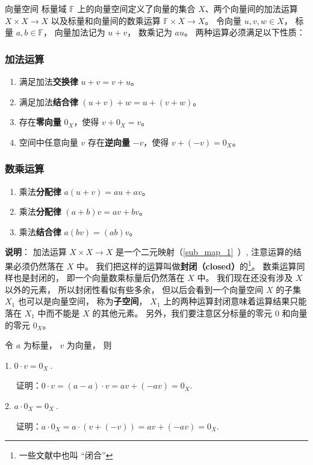 \begin{definition}{向量空间}
标量域 $\mathbb F$ 上的向量空间定义了向量的集合 $X$、两个向量间的加法运算 $X\times X \to X$ 以及标量和向量间的数乘运算 $\mathbb F \times X \to X$。 令向量 $u,v,w \in X$， 标量 $a,b \in \mathbb F$， 向量加法记为 $u + v$， 数乘记为 $a u$。 两种运算必须满足以下性质：

\subsubsection{加法运算}
\begin{enumerate}
\item 满足加法\textbf{交换律} $u + v = v + u$。
\item 满足加法\textbf{结合律} $(u + v) + w = u + (v + w)$。
\item 存在\textbf{零向量} $0_X$，使得 $v + 0_X = v$。
\item 空间中任意向量 $v$ 存在\textbf{逆向量} $-v$，使得 $v + (-v) = 0_X$。
\end{enumerate}

\subsubsection{数乘运算}
\begin{enumerate}
\item 乘法\textbf{分配律} $a(u + v) = au + av$。
\item 乘法\textbf{分配律} $(a + b)v = av + bv$。
\item 乘法\textbf{结合律} $a (b v) = (ab) v$。
\end{enumerate}
\end{definition}

\textbf{说明}： 加法运算 $X \times X \to X$ 是一个二元映射（\autoref{sub_map_1}~）, 注意运算的结果必须仍然落在 $X$ 中。 我们把这样的运算叫做\textbf{封闭（closed）}的\footnote{一些文献中也叫 “闭合”}。 数乘运算同样也是封闭的， 即一个向量数乘标量后仍然落在 $X$ 中。 我们现在还没有涉及 $X$ 以外的元素， 所以封闭性看似有些多余， 但以后会看到一个向量空间 $X$ 的子集 $X_1$ 也可以是向量空间， 称为\textbf{子空间}， $X_1$ 上的两种运算封闭意味着运算结果只能落在 $X_1$ 中而不能是 $X$ 的其他元素。 另外，我们要注意区分标量的零元 $0$ 和向量的零元 $0_X$。

\begin{corollary}{}
令 $a$ 为标量， $v$ 为向量， 则

1. $0\cdot v=0_X~.$

$\quad$ 证明：$0\cdot v=(a-a)\cdot v=av+(-av)=0_X$.

2. $a \cdot 0_X=0_X~.$

$\quad$ 证明：$a \cdot 0_X=a\cdot(v+(-v))=av+(-av)=0_X$.

\end{corollary}

